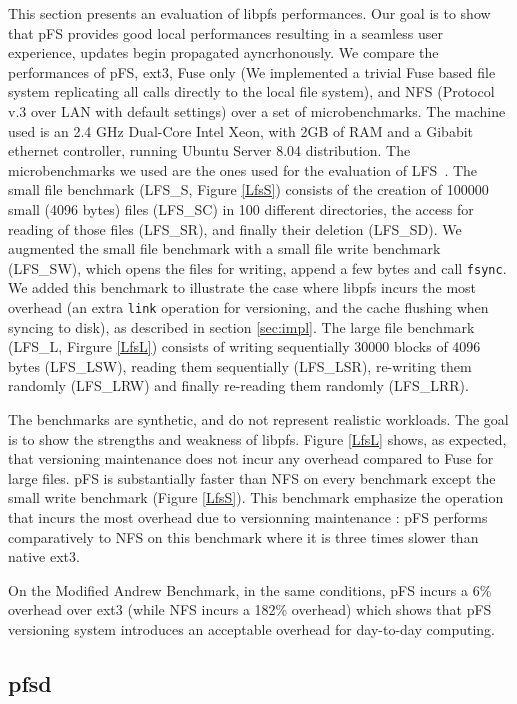 This section presents an evaluation of libpfs performances. Our goal
is to show that pFS provides good local performances resulting in a
seamless user experience, updates begin propagated ayncrhonously. We
compare the performances of pFS, ext3, Fuse only (We implemented a
trivial Fuse based file system replicating all calls directly to the
local file system), and NFS (Protocol v.3 over LAN with default
settings) over a set of microbenchmarks. The machine used is an 2.4
GHz Dual-Core Intel Xeon, with 2GB of RAM and a Gibabit ethernet
controller, running Ubuntu Server 8.04 distribution. The
microbenchmarks we used are the ones used for the evaluation of
LFS~\cite{rosenblum:lfs}. The small file benchmark (LFS\_S, Figure
\ref{LfsS}) consists of the creation of 100000 small (4096 bytes)
files (LFS\_SC) in 100 different directories, the access for reading
of those files (LFS\_SR), and finally their deletion (LFS\_SD). We
augmented the small file benchmark with a small file write benchmark
(LFS\_SW), which opens the files for writing, append a few bytes and
call {\tt fsync}.  We added this benchmark to illustrate the case where
libpfs incurs the most overhead (an extra {\tt link} operation for
versioning, and the cache flushing when syncing to disk), as described in
section \ref{sec:impl}. The large file benchmark (LFS\_L, Firgure
\ref{LfsL}) consists of writing sequentially 30000 blocks of 4096
bytes (LFS\_LSW), reading them sequentially (LFS\_LSR), re-writing
them randomly (LFS\_LRW) and finally re-reading them randomly
(LFS\_LRR).

The benchmarks are synthetic, and do not represent realistic
workloads. The goal is to show the strengths and weakness of
libpfs. Figure \ref{LfsL} shows, as expected, that versioning
maintenance does not incur any overhead compared to Fuse for large
files. pFS is substantially faster than NFS on every benchmark except
the small write benchmark (Figure \ref{LfsS}). This benchmark
emphasize the operation that incurs the most overhead due to
versionning maintenance : pFS performs comparatively to NFS on this
benchmark where it is three times slower than native ext3.

On the Modified Andrew Benchmark, in the same conditions, pFS incurs a
6\% overhead over ext3 (while NFS incurs a 182\% overhead) which shows
that pFS versioning system introduces an acceptable overhead for
day-to-day computing.

\subsection{pfsd}

